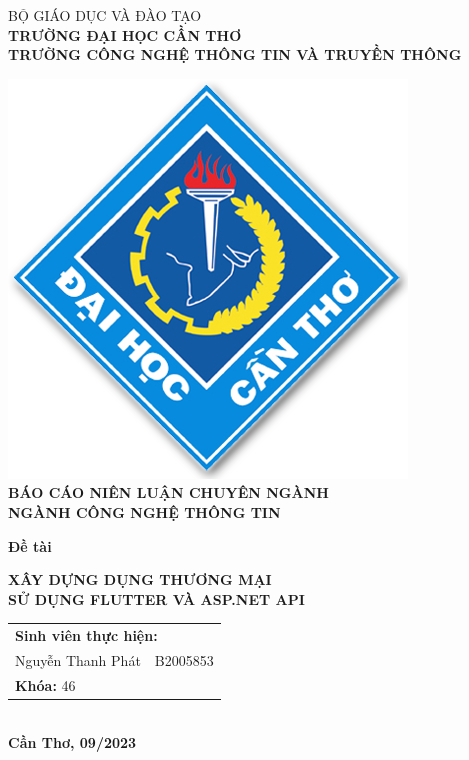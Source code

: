 
\begin{titlepage}

    \begin{center}

        BỘ GIÁO DỤC VÀ ĐÀO TẠO\\
        \textbf{TRƯỜNG ĐẠI HỌC CẦN THƠ\\}
        \textbf{TRƯỜNG CÔNG NGHỆ THÔNG TIN VÀ TRUYỀN THÔNG\\[1cm]}

        \includegraphics{../images/logo.png}\\[1cm]

        \textbf{BÁO CÁO NIÊN LUẬN CHUYÊN NGÀNH\\}
        \textbf{NGÀNH CÔNG NGHỆ THÔNG TIN\\[2cm]}

        \begin{large}
            \textbf{Đề tài\\[0.5cm]}
        \end{large}
        \textbf{{\LARGE XÂY DỰNG DỤNG THƯƠNG MẠI \\ SỬ DỤNG FLUTTER VÀ ASP.NET API}}
        \\[3.5cm]

        \begin{tabular}{ l l }
            \multicolumn{2}{l}{\textbf{Sinh viên thực hiện:}} \\
            Nguyễn Thanh Phát & B2005853                      \\
            \multicolumn{2}{l}{\textbf{Khóa:} 46}             \\
        \end{tabular}
        \\[4cm]

        \textbf{Cần Thơ, 09/2023}

    \end{center}

\end{titlepage}
